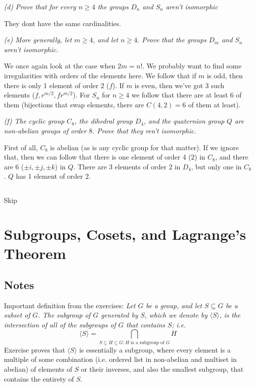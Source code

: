 \documentclass[11pt,oneside,titlepage]{book}
\newcommand{\eangle}[1]{\langle #1 \rangle}
\begin{document}
\textit{(d) Prove that for every $n \geq 4$ the groups $D_n$ and $S_n$
  aren't isomorphic}

They dont have the same cardinalities.

\textit{(e) More generally, let $m \geq 4$, and let $n \geq 4$. Prove
  that the groups $D_m$ and $S_n$ aren't isomorphic.}

We once again look at the case when $2m = n!$. We probably want to
find some irregularities with orders of the elements here.  We follow
that if $m$ is odd, then there is only 1 element of order $2$ ($f$).
If $m$ is even, then we've got 3 such elements ($f, r^{m/2}, fr^{m/2}$).
For $S_n$ for $n \geq 4$ we follow that there are at least 6 of them
(bijections that swap elements, there are $C(4, 2) = 6$ of them at least).

\textit{(f) The cyclic group $C_8$, the dihedral group $D_4$, and the quaternion group
  $Q$ are non-abelian groups of order $8$. Prove that they ren't isomorphic.}

First of all, $C_8$ is abelian (as is any cyclic group for that
matter). If we ignore that, then we can follow that there is one
element of order 4 ($2$) in $C_8$, and there are 6 ($\pm i, \pm j, \pm
k$) in $Q$. There are 3 elements of order $2$ in $D_4$, but only one
in $C_8$. $Q$ has 1 element of order $2$.

\subsection{}

Skip

\section{Subgroups, Cosets, and Lagrange's Theorem}

\subsection*{Notes}

Important definition from the exercises:
\textit{Let $G$ be a group, and let $S \subseteq G$ be a subset of
$G$. The subgroup of $G$ generated by $S$, which we denote by
$\eangle{S}$, is the intersection of all of the subgroups of $G$ that
contains $S$; i.e.
  $$\eangle{S} = \bigcap_{S \subseteq H \subseteq G: H\text{ is a subgroup of }G} H$$}
Exercise proves that $\eangle{S}$ is essentially a subgroup, where
every element is a multiple of some combination (i.e. ordered list in
non-abelian and multiset in abelian) of elements of $S$ or their
inverses, and also the smallest subgroup, that contains the entirety
of $S$.
\end{document}
